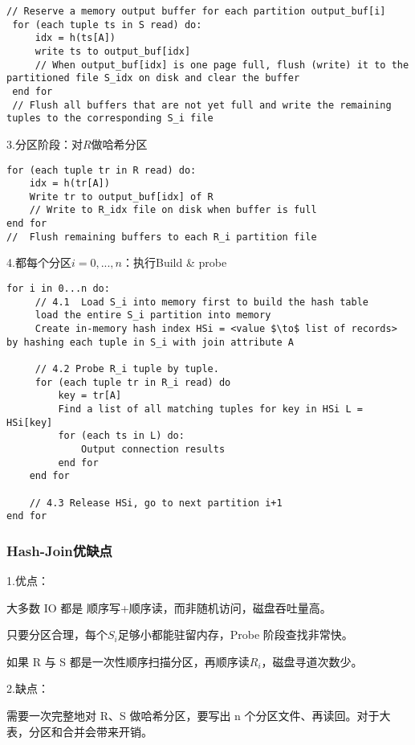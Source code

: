 \begin{lstlisting}[style=sqlstyle]
 // Reserve a memory output buffer for each partition output_buf[i]
 for (each tuple ts in S read) do:
     idx = h(ts[A])
     write ts to output_buf[idx]
     // When output_buf[idx] is one page full, flush (write) it to the partitioned file S_idx on disk and clear the buffer
 end for
 // Flush all buffers that are not yet full and write the remaining tuples to the corresponding S_i file
\end{lstlisting}

\noindent 3.分区阶段：对$R$做哈希分区

\begin{lstlisting}[style=sqlstyle]
for (each tuple tr in R read) do:
    idx = h(tr[A])
    Write tr to output_buf[idx] of R
    // Write to R_idx file on disk when buffer is full
end for
//  Flush remaining buffers to each R_i partition file   
\end{lstlisting}

\noindent 4.都每个分区$i=0,...,n$：执行Build \& probe
\begin{lstlisting}[style=sqlstyle]
 for i in 0...n do:
     // 4.1  Load S_i into memory first to build the hash table
     load the entire S_i partition into memory
     Create in-memory hash index HSi = <value $\to$ list of records> by hashing each tuple in S_i with join attribute A
     
     // 4.2 Probe R_i tuple by tuple.
     for (each tuple tr in R_i read) do
         key = tr[A]
         Find a list of all matching tuples for key in HSi L = HSi[key]
         for (each ts in L) do:
             Output connection results
         end for
    end for 

    // 4.3 Release HSi, go to next partition i+1
end for
\end{lstlisting}

\subsubsection{Hash-Join优缺点}

\noindent 1.优点：

大多数 IO 都是 顺序写+顺序读，而非随机访问，磁盘吞吐量高。

只要分区合理，每个$S_i$足够小都能驻留内存，Probe 阶段查找非常快。

如果 R 与 S 都是一次性顺序扫描分区，再顺序读$R_i$，磁盘寻道次数少。

\noindent 2.缺点：

需要一次完整地对 R、S 做哈希分区，要写出 n 个分区文件、再读回。对于大表，分区和合并会带来开销。

